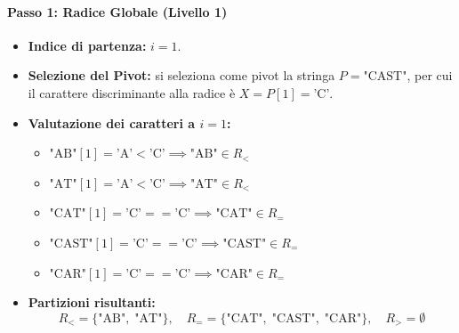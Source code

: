 \paragraph{Passo 1: Radice Globale (Livello 1)}
\begin{itemize}
  \item \textbf{Indice di partenza:} $i = 1$.
  \item \textbf{Selezione del Pivot:} si seleziona come pivot la stringa $P = \text{"CAST"}$, per cui il carattere discriminante alla radice \`e $X = P[1] = \text{'C'}$.
  \item \textbf{Valutazione dei caratteri a $i = 1$:}
  \begin{itemize}
    \item $\text{"AB"}[1] = \text{'A'} < \text{'C'} \implies \text{"AB"} \in R_{<}$
    \item $\text{"AT"}[1] = \text{'A'} < \text{'C'} \implies \text{"AT"} \in R_{<}$
    \item $\text{"CAT"}[1] = \text{'C'} == \text{'C'} \implies \text{"CAT"} \in R_{=}$
    \item $\text{"CAST"}[1] = \text{'C'} == \text{'C'} \implies \text{"CAST"} \in R_{=}$
    \item $\text{"CAR"}[1] = \text{'C'} == \text{'C'} \implies \text{"CAR"} \in R_{=}$
  \end{itemize}
  \item \textbf{Partizioni risultanti:}
  \begin{equation}
    R_{<} = \{\text{"AB"}, \; \text{"AT"}\}, \quad R_{=} = \{\text{"CAT"}, \; \text{"CAST"}, \; \text{"CAR"}\}, \quad R_{>} = \emptyset
  \end{equation}
\end{itemize}

